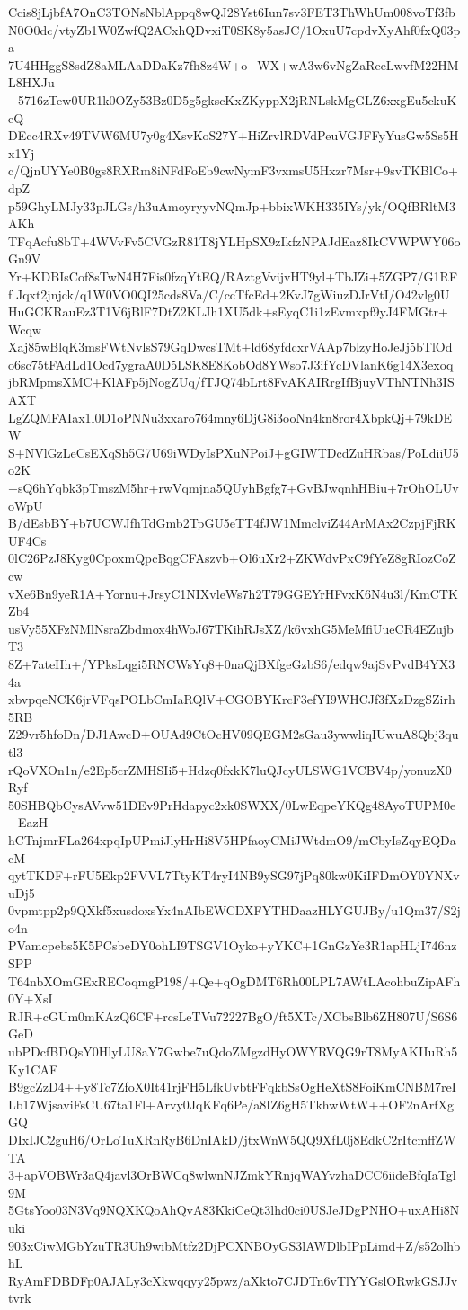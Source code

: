 Ccis8jLjbfA7OnC3TONsNblAppq8wQJ28Yst6Iun7sv3FET3ThWhUm008voTf3fb
N0O0dc/vtyZb1W0ZwfQ2ACxhQDvxiT0SK8y5asJC/1OxuU7cpdvXyAhf0fxQ03pa
7U4HHggS8sdZ8aMLAaDDaKz7fh8z4W+o+WX+wA3w6vNgZaReeLwvfM22HML8HXJu
+5716zTew0UR1k0OZy53Bz0D5g5gkscKxZKyppX2jRNLskMgGLZ6xxgEu5ckuKeQ
DEcc4RXv49TVW6MU7y0g4XsvKoS27Y+HiZrvlRDVdPeuVGJFFyYusGw5Ss5Hx1Yj
c/QjnUYYe0B0gs8RXRm8iNFdFoEb9cwNymF3vxmsU5Hxzr7Msr+9svTKBlCo+dpZ
p59GhyLMJy33pJLGs/h3uAmoyryyvNQmJp+bbixWKH335IYs/yk/OQfBRltM3AKh
TFqAcfu8bT+4WVvFv5CVGzR81T8jYLHpSX9zIkfzNPAJdEaz8IkCVWPWY06oGn9V
Yr+KDBIsCof8sTwN4H7Fis0fzqYtEQ/RAztgVvijvHT9yl+TbJZi+5ZGP7/G1RFf
Jqxt2jnjck/q1W0VO0QI25cds8Va/C/ccTfcEd+2KvJ7gWiuzDJrVtI/O42vlg0U
HuGCKRauEz3T1V6jBlF7DtZ2KLJh1XU5dk+sEyqC1i1zEvmxpf9yJ4FMGtr+Wcqw
Xaj85wBlqK3msFWtNvlsS79GqDwcsTMt+ld68yfdcxrVAAp7blzyHoJeJj5bTlOd
o6sc75tFAdLd1Ocd7ygraA0D5LSK8E8KobOd8YWso7J3ifYcDVlanK6g14X3exoq
jbRMpmsXMC+KlAFp5jNogZUq/fTJQ74bLrt8FvAKAIRrgIfBjuyVThNTNh3ISAXT
LgZQMFAIax1l0D1oPNNu3xxaro764mny6DjG8i3ooNn4kn8ror4XbpkQj+79kDEW
S+NVlGzLeCsEXqSh5G7U69iWDyIsPXuNPoiJ+gGIWTDcdZuHRbas/PoLdiiU5o2K
+sQ6hYqbk3pTmszM5hr+rwVqmjna5QUyhBgfg7+GvBJwqnhHBiu+7rOhOLUvoWpU
B/dEsbBY+b7UCWJfhTdGmb2TpGU5eTT4fJW1MmclviZ44ArMAx2CzpjFjRKUF4Cs
0lC26PzJ8Kyg0CpoxmQpcBqgCFAszvb+Ol6uXr2+ZKWdvPxC9fYeZ8gRIozCoZcw
vXe6Bn9yeR1A+Yornu+JrsyC1NIXvleWs7h2T79GGEYrHFvxK6N4u3l/KmCTKZb4
usVy55XFzNMlNsraZbdmox4hWoJ67TKihRJsXZ/k6vxhG5MeMfiUueCR4EZujbT3
8Z+7ateHh+/YPksLqgi5RNCWsYq8+0naQjBXfgeGzbS6/edqw9ajSvPvdB4YX34a
xbvpqeNCK6jrVFqsPOLbCmIaRQlV+CGOBYKrcF3efYI9WHCJf3fXzDzgSZirh5RB
Z29vr5hfoDn/DJ1AwcD+OUAd9CtOcHV09QEGM2sGau3ywwliqIUwuA8Qbj3qutl3
rQoVXOn1n/e2Ep5crZMHSIi5+Hdzq0fxkK7luQJcyULSWG1VCBV4p/yonuzX0Ryf
50SHBQbCysAVvw51DEv9PrHdapyc2xk0SWXX/0LwEqpeYKQg48AyoTUPM0e+EazH
hCTnjmrFLa264xpqIpUPmiJlyHrHi8V5HPfaoyCMiJWtdmO9/mCbyIsZqyEQDacM
qytTKDF+rFU5Ekp2FVVL7TtyKT4ryI4NB9ySG97jPq80kw0KiIFDmOY0YNXvuDj5
0vpmtpp2p9QXkf5xusdoxsYx4nAIbEWCDXFYTHDaazHLYGUJBy/u1Qm37/S2jo4n
PVamcpebs5K5PCsbeDY0ohLI9TSGV1Oyko+yYKC+1GnGzYe3R1apHLjI746nzSPP
T64nbXOmGExRECoqmgP198/+Qe+qOgDMT6Rh00LPL7AWtLAcohbuZipAFh0Y+XsI
RJR+cGUm0mKAzQ6CF+rcsLeTVu72227BgO/ft5XTc/XCbsBlb6ZH807U/S6S6GeD
ubPDcfBDQsY0HlyLU8aY7Gwbe7uQdoZMgzdHyOWYRVQG9rT8MyAKIIuRh5Ky1CAF
B9gcZzD4++y8Tc7ZfoX0It41rjFH5LfkUvbtFFqkbSsOgHeXtS8FoiKmCNBM7reI
Lb17WjsaviFsCU67ta1Fl+Arvy0JqKFq6Pe/a8IZ6gH5TkhwWtW++OF2nArfXgGQ
DIxIJC2guH6/OrLoTuXRnRyB6DnIAkD/jtxWnW5QQ9XfL0j8EdkC2rItcmffZWTA
3+apVOBWr3aQ4javl3OrBWCq8wlwnNJZmkYRnjqWAYvzhaDCC6iideBfqIaTgl9M
5GtsYoo03N3Vq9NQXKQoAhQvA83KkiCeQt3lhd0ci0USJeJDgPNHO+uxAHi8Nuki
903xCiwMGbYzuTR3Uh9wibMtfz2DjPCXNBOyGS3lAWDlbIPpLimd+Z/s52olhbhL
RyAmFDBDFp0AJALy3cXkwqqyy25pwz/aXkto7CJDTn6vTlYYGslORwkGSJJvtvrk
